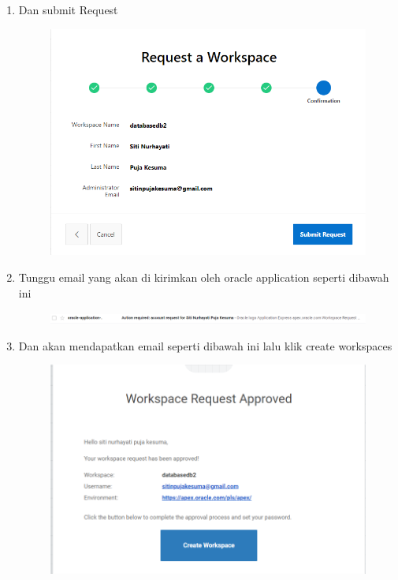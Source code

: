 \begin{enumerate}
	\item Dan submit Request
	\begin{figure} [!htbp]
	\includegraphics[scale=0.2]{Apex/7.png}
	\centering
	\end{figure}
	
	\item Tunggu email yang akan di kirimkan oleh oracle application seperti dibawah ini 
	\begin{figure} [!htbp]
	\includegraphics[scale=0.2]{Apex/9.png}
	\centering
	\end{figure}
	
	\item Dan akan mendapatkan email seperti dibawah ini lalu klik create workspaces 
	\begin{figure} [!htbp]
	\includegraphics[scale=0.2]{Apex/10.png}
	\centering
	\end{figure}
	

\end{enumerate}
